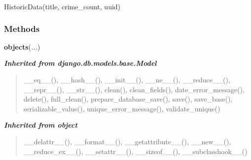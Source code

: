 HistoricData(title, crime\_count, uuid)



  \subsubsection{Methods}

    \label{spatio_main:models:HistoricData:objects}

    \vspace{0.5ex}

\hspace{.8\funcindent}\begin{boxedminipage}{\funcwidth}

    \raggedright \textbf{objects}(\textit{...})

\setlength{\parskip}{2ex}
\setlength{\parskip}{1ex}
    \end{boxedminipage}


\large{\textbf{\textit{Inherited from django.db.models.base.Model}}}

\begin{quote}
\_\_eq\_\_(), \_\_hash\_\_(), \_\_init\_\_(), \_\_ne\_\_(), \_\_reduce\_\_(), \_\_repr\_\_(), \_\_str\_\_(), clean(), clean\_fields(), date\_error\_message(), delete(), full\_clean(), prepare\_database\_save(), save(), save\_base(), serializable\_value(), unique\_error\_message(), validate\_unique()
\end{quote}

\large{\textbf{\textit{Inherited from object}}}

\begin{quote}
\_\_delattr\_\_(), \_\_format\_\_(), \_\_getattribute\_\_(), \_\_new\_\_(), \_\_reduce\_ex\_\_(), \_\_setattr\_\_(), \_\_sizeof\_\_(), \_\_subclasshook\_\_()
\end{quote}


